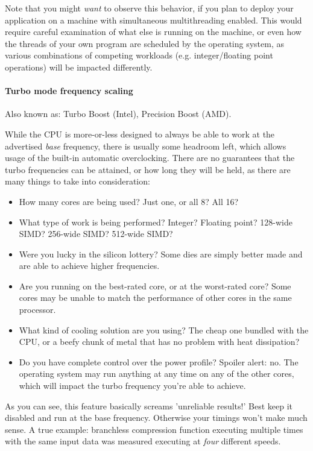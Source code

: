 \documentclass[hidelinks,titlepage,a4paper]{article}
\begin{document}
Note that you might \emph{want} to observe this behavior, if you plan to deploy your application on a machine with simultaneous multithreading enabled. This would require careful examination of what else is running on the machine, or even how the threads of your own program are scheduled by the operating system, as various combinations of competing workloads (e.g. integer/floating point operations) will be impacted differently.

\paragraph{Turbo mode frequency scaling}

Also known as: Turbo Boost (Intel), Precision Boost (AMD).

While the CPU is more-or-less designed to always be able to work at the advertised \emph{base} frequency, there is usually some headroom left, which allows usage of the built-in automatic overclocking. There are no guarantees that the turbo frequencies can be attained, or how long they will be held, as there are many things to take into consideration:

\begin{itemize}
\item How many cores are being used? Just one, or all 8? All 16?
\item What type of work is being performed? Integer? Floating point? 128-wide SIMD? 256-wide SIMD? 512-wide SIMD?
\item Were you lucky in the silicon lottery? Some dies are simply better made and are able to achieve higher frequencies.
\item Are you running on the best-rated core, or at the worst-rated core? Some cores may be unable to match the performance of other cores in the same processor.
\item What kind of cooling solution are you using? The cheap one bundled with the CPU, or a beefy chunk of metal that has no problem with heat dissipation?
\item Do you have complete control over the power profile? Spoiler alert: no. The operating system may run anything at any time on any of the other cores, which will impact the turbo frequency you're able to achieve.
\end{itemize}

As you can see, this feature basically screams 'unreliable results!' Best keep it disabled and run at the base frequency. Otherwise your timings won't make much sense. A true example: branchless compression function executing multiple times with the same input data was measured executing at \emph{four} different speeds.
\end{document}
